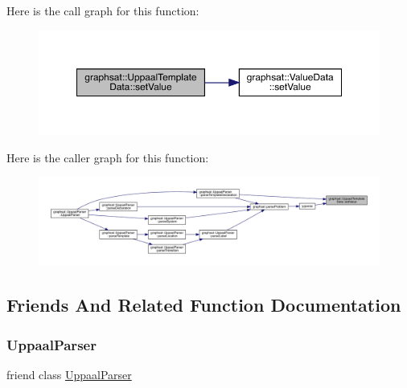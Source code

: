 Here is the call graph for this function\+:
\nopagebreak
\begin{figure}[H]
\begin{center}
\leavevmode
\includegraphics[width=350pt]{classgraphsat_1_1_uppaal_template_data_ac06f0426517095016aaa34fe0b933ff1_cgraph}
\end{center}
\end{figure}
Here is the caller graph for this function\+:
\nopagebreak
\begin{figure}[H]
\begin{center}
\leavevmode
\includegraphics[width=350pt]{classgraphsat_1_1_uppaal_template_data_ac06f0426517095016aaa34fe0b933ff1_icgraph}
\end{center}
\end{figure}


\subsection{Friends And Related Function Documentation}
\mbox{\label{classgraphsat_1_1_uppaal_template_data_a109751399645ae1eb967f5e18e57ee30}} 
\subsubsection{\texorpdfstring{UppaalParser}{UppaalParser}}
{\footnotesize\ttfamily friend class \mbox{\hyperlink{classgraphsat_1_1_uppaal_parser}{Uppaal\+Parser}}\hspace{0.3cm}{\ttfamily [friend]}}



